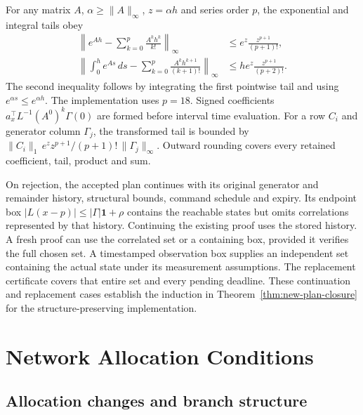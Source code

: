 \documentclass[journal,10pt]{IEEEtran}
\begin{document}
For any matrix $A$, $\alpha\ge\|A\|_\infty$, $z=\alpha h$ and series order
$p$, the exponential and integral tails obey
\begin{equation}
 \begin{aligned}
 \left\|e^{Ah}-\sum_{k=0}^p\frac{A^kh^k}{k!}\right\|_\infty
       &\le e^z\frac{z^{p+1}}{(p+1)!},\\
 \left\|\int_0^h e^{As}\,ds-
          \sum_{k=0}^p\frac{A^kh^{k+1}}{(k+1)!}\right\|_\infty
       &\le he^z\frac{z^{p+1}}{(p+2)!}.
 \end{aligned}
 \label{eq:structure-matrix-tails}
\end{equation}
The second inequality follows by integrating the first pointwise tail and
using $e^{\alpha s}\le e^{\alpha h}$. The implementation uses $p=18$.
Signed coefficients $a_x^\top L^{-1}(A^0)^k\Gamma(0)$ are formed before
interval time evaluation. For a row $C_i$ and generator column $\Gamma_j$,
the transformed tail is bounded by
$\|C_i\|_1\,e^z z^{p+1}/(p+1)!\,\|\Gamma_j\|_\infty$.
Outward rounding covers every retained coefficient, tail, product and sum.

On rejection, the accepted plan continues with its original generator and
remainder history, structural bounds, command schedule and expiry. Its
endpoint box $|L(x-p)|\le |\Gamma|\mathbf1+\rho$ contains the reachable
states but omits correlations represented by that history. Continuing the
existing proof uses the stored history. A fresh proof can use the correlated
set or a containing box, provided it verifies the full chosen set. A
timestamped observation box supplies an independent set containing the
actual state under its measurement assumptions. The replacement certificate
covers that entire set and every pending deadline. These continuation and
replacement cases establish the induction in
Theorem~\ref{thm:new-plan-closure} for the structure-preserving implementation.

\section{Network Allocation Conditions}
\label{app:network-assumptions}

\subsection{Allocation changes and branch structure}
\end{document}

